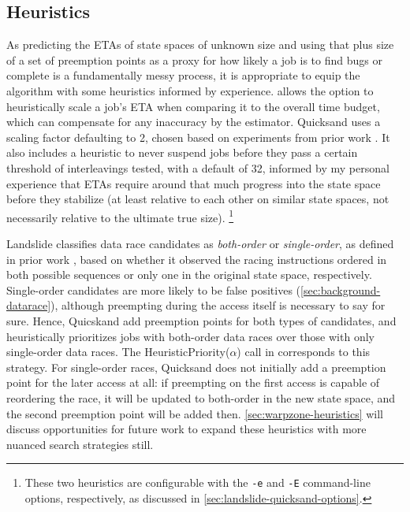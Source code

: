 \subsection{Heuristics}
\label{sec:quicksand-heuristics}

As predicting the ETAs of state spaces of unknown size
and using that plus size of a set of preemption points as a proxy for how likely a job is to find bugs or complete
is a fundamentally messy process,
it is appropriate to equip the algorithm with some heuristics informed by experience.
 allows the option to heuristically scale a job's ETA
when comparing it to the overall time budget,
which can compensate for any inaccuracy by the estimator.
Quicksand uses a scaling factor defaulting to 2,
chosen based on experiments from prior work \cite{estimation}.
It also includes a heuristic to
never suspend jobs before they pass a certain threshold of interleavings tested,
with a default of 32,
informed by my personal experience that ETAs require around that much progress into the state space
before they stabilize (at least relative to each other on similar state spaces,
not necessarily relative to the ultimate true size).%
\footnote{These two heuristics are configurable with the
{\tt -e} and {\tt -E} command-line options, respectively,
as discussed in \cref{sec:landslide-quicksand-options}.}

Landslide classifies data race candidates as {\em both-order} or {\em single-order},
as defined in prior work \cite{portend},
based on whether it observed the racing instructions ordered in both possible sequences or only one
in the original state space, respectively.
Single-order candidates are more likely to be false positives (\cref{sec:background-datarace}),
although preempting during the access itself is necessary to say for sure.
Hence, Quicskand add preemption points for both types of candidates,
and heuristically prioritizes jobs with both-order data races
over those with only single-order data races.
The HeuristicPriority($\alpha$) call in  corresponds to this strategy.
For single-order races, Quicksand does not initially add a preemption point for the later access at all:
if preempting on the first access is capable of reordering the race,
it will be updated to both-order in the new state space, and the second preemption point will be added then.
\cref{sec:warpzone-heuristics} will discuss opportunities for future work to expand
these heuristics with more nuanced search strategies still.

